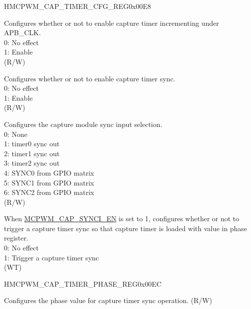 \begin{register}{H}{MCPWM\_CAP\_TIMER\_CFG\_REG}{0x00E8}\label{regdesc:MCPWMCAPTIMERCFGREG}
%
%
%
%
%
\regnewline%
\begin{regdesc}\begin{reglist}
\label{fielddesc:MCPWMCAPTIMEREN}\item [MCPWM\_CAP\_TIMER\_EN] Configures whether or not to enable capture timer incrementing under APB\_CLK. \\
0: No effect\\
1: Enable\\
(R/W)
\label{fielddesc:MCPWMCAPSYNCIEN}\item [MCPWM\_CAP\_SYNCI\_EN] Configures whether or not to enable capture timer sync. \\
0: No effect\\
1: Enable\\
(R/W)
\label{fielddesc:MCPWMCAPSYNCISEL}\item [MCPWM\_CAP\_SYNCI\_SEL] Configures the capture module sync input selection.
\\0: None
\\1: timer0 sync out
\\2: timer1 sync out
\\3: timer2 sync out
\\4: SYNC0 from GPIO matrix
\\5: SYNC1 from GPIO matrix
\\6: SYNC2 from GPIO matrix
\\(R/W)
\label{fielddesc:MCPWMCAPSYNCSW}\item [MCPWM\_CAP\_SYNC\_SW] When \hyperref[fielddesc:MCPWMCAPSYNCIEN]{MCPWM\_CAP\_SYNCI\_EN} is set to 1, configures whether or not to trigger a capture timer sync so that capture timer is loaded with value in phase register. \\
0: No effect\\
1: Trigger a capture timer sync\\
(WT)
\end{reglist}\end{regdesc}
\end{register}


\begin{register}{H}{MCPWM\_CAP\_TIMER\_PHASE\_REG}{0x00EC}\label{regdesc:MCPWMCAPTIMERPHASEREG}
%
\regnewline%
\begin{regdesc}\begin{reglist}
\label{fielddesc:MCPWMCAPPHASE}\item [MCPWM\_CAP\_PHASE] Configures the phase value for capture timer sync operation. (R/W)
\end{reglist}\end{regdesc}
\end{register}


